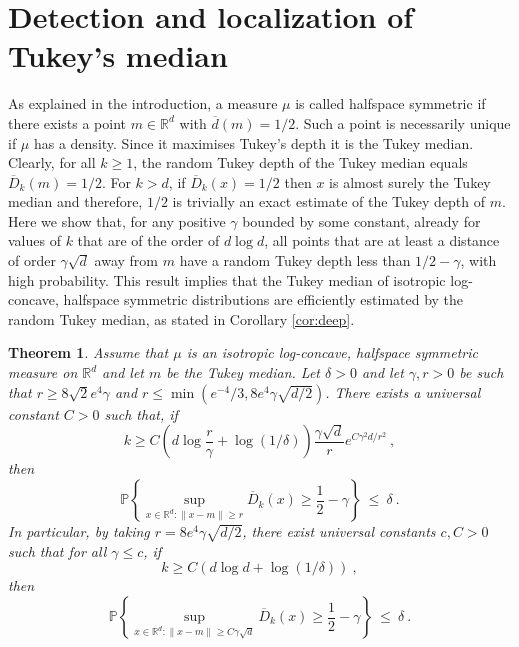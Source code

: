 \documentclass[12pt]{article}
\newcommand{\R}{\mathbb{R}}
\newcommand{\PP}{\mathbb{P}}
\newcommand{\ol}{\overline}
\newtheorem{theorem}{Theorem}
\begin{document}
\section{Detection and localization of Tukey's median}
\label{sec:deep}

As explained in the introduction, a measure $\mu$ is called halfspace
symmetric if there exists a point $m\in \R^d$ with $\ol{d}(m)=1/2$.
Such a point is necessarily unique if $\mu$ has a density. Since it maximises Tukey's depth it is the Tukey median.
Clearly, for all $k\ge 1$, the random Tukey depth of the Tukey median
equals $\ol{D}_k(m)=1/2$. For $k>d$, if $\ol{D}_k(x)=1/2$ then $x$ is almost surely the Tukey median
and therefore, $1/2$ is trivially an exact estimate of the Tukey depth of
$m$. Here we show that, for any positive $\gamma$ bounded by some
constant,
already for values of $k$ that are of the order
of $d\log d$, all points that are at least a distance of 
order $\gamma \sqrt{d}$ away from $m$ have a random Tukey depth less than
$1/2-\gamma$, with high probability. This result implies that 
the Tukey median of isotropic log-concave, halfspace symmetric
distributions are efficiently estimated by the random Tukey median,
as stated in Corollary \ref{cor:deep}.

\begin{theorem}
\label{thm:deep}
Assume that $\mu$ is an isotropic log-concave, halfspace symmetric measure on $\R^d$ and let $m$ be the Tukey median.
Let $\delta>0$ and let $\gamma,r>0$ be such that
$r\ge 8\sqrt{2} e^4 \gamma$ and $r\le \min\left(e^{-4}/3, 8e^4\gamma \sqrt{d/2}\right)$.
There exists a universal constant $C>0$ such that, if
\[
  k \geq
  C\left(d\log \frac{r}{\gamma} +\log(1/\delta)\right) \frac{\gamma\sqrt{d}}{r}e^{C\gamma^2d/r^2}  ~,
\]
then
\[
  \PP\left\{ \sup_{x\in \R^d: \left\| x-m\right\| \geq r} \ol{D}_k (x)
    \geq \frac{1}{2}- \gamma  \right\} \ \leq \ \delta~. 
\]
In particular, by taking $r=8e^4\gamma\sqrt{d/2}$,
there exist universal constants $c,C>0$ such that for all $\gamma \le
c$, if
\[
  k \geq
  C\left(d\log d+\log(1/\delta)\right)~,
\]
then
\[
  \PP\left\{ \sup_{x\in \R^d: \left\| x-m\right\| \geq C\gamma\sqrt{d}}\ol{D}_k (x) \geq \frac{1}{2}- \gamma  \right\} \ \leq \ \delta~. 
\]
\end{theorem}
\end{document}
